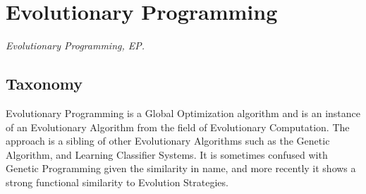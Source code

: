 

\section{Evolutionary Programming} 
\label{sec:evolutionary_programming}

\emph{Evolutionary Programming, EP.}

\subsection{Taxonomy}
Evolutionary Programming is a Global Optimization algorithm and is an instance of an Evolutionary Algorithm from the field of Evolutionary Computation.
The approach is a sibling of other Evolutionary Algorithms such as the Genetic Algorithm, and Learning Classifier Systems. It is sometimes confused with Genetic Programming given the similarity in name, and more recently it shows a strong functional similarity to Evolution Strategies. 

